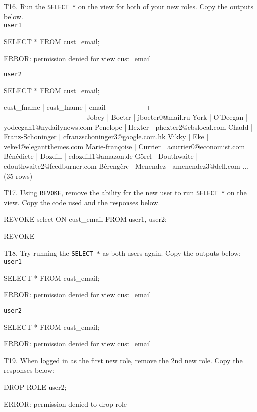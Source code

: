 T16. Run the \verb|SELECT *| on the view for both of your new roles. Copy the outputs below.\\
\texttt{user1}
\begin{sql}
SELECT * FROM cust_email;
\end{sql}
\begin{pseudo}
ERROR:  permission denied for view cust_email
\end{pseudo}
\texttt{user2}
\begin{sql}
SELECT * FROM cust_email;
\end{sql}
\begin{pseudo}
 cust_fname    |    cust_lname    |               email
-----------------+------------------+-----------------------------------
 Jobey           | Boeter           | jboeter0@mail.ru
 York            | O'Deegan         | yodeegan1@nydailynews.com
 Penelope        | Hexter           | phexter2@cbslocal.com
 Chadd           | Franz-Schoninger | cfranzschoninger3@google.com.hk
 Vikky           | Eke              | veke4@elegantthemes.com
 Marie-françoise | Currier          | acurrier0@economist.com
 Bénédicte       | Dozdill          | cdozdill1@amazon.de
 Görel           | Douthwaite       | edouthwaite2@feedburner.com
 Bérengère       | Menendez         | amenendez3@dell.com
...
(35 rows)
\end{pseudo}

T17. Using \verb|REVOKE|, remove the ability for the new user to run \verb|SELECT *| on the view. Copy the code used and the responses below.
\begin{sql}
REVOKE select ON cust_email FROM user1, user2;
\end{sql}
\begin{pseudo}
REVOKE
\end{pseudo}

T18. Try running the \verb|SELECT *| as both users again. Copy the outputs below:
\texttt{user1}
\begin{sql}
SELECT * FROM cust_email;
\end{sql}
\begin{pseudo}
ERROR:  permission denied for view cust_email
\end{pseudo}
\texttt{user2}
\begin{sql}
SELECT * FROM cust_email;
\end{sql}
\begin{pseudo}
ERROR:  permission denied for view cust_email
\end{pseudo}

T19. When logged in as the first new role, remove the 2nd new role. Copy the responses below:
\begin{sql}
DROP ROLE user2;
\end{sql}
\begin{pseudo}
ERROR:  permission denied to drop role
\end{pseudo}

